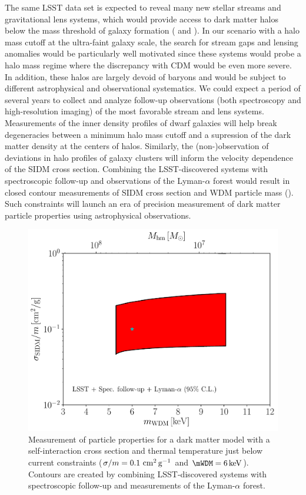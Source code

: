 The same LSST data set is expected to reveal many new stellar streams and gravitational lens systems, which would provide access to dark matter halos below the mass threshold of galaxy formation ( and ).
In our scenario with a halo mass cutoff at the ultra-faint galaxy scale, the search for stream gaps and lensing anomalies would be particularly well motivated since these systems would probe a halo mass regime where the discrepancy with CDM would be even more severe.
In addition, these halos are largely devoid of baryons and would be subject to different astrophysical and observational systematics.
We could expect a period of several years to collect and analyze follow-up observations (both spectroscopy and high-resolution imaging) of the most favorable stream and lens systems.
Measurements of the inner density profiles of dwarf galaxies will help break degeneracies between a minimum halo mass cutoff and a supression of the dark matter density at the centers of halos.
Similarly, the (non-)observation of deviations in halo profiles of galaxy clusters will inform the velocity dependence of the SIDM cross section.
Combining the LSST-discovered systems with spectroscopic follow-up and observations of the Lyman-$\alpha$ forest would result in closed contour measurements of SIDM cross section and WDM particle mass (\citep{sidm_wdm_disc}).
Such constraints will launch an era of precision measurement of dark matter particle properties using astrophysical observations.

\begin{figure}
\centering
\includegraphics[width=0.6\columnwidth]{figures/SIDM_WDM_fig_disc.pdf}
\caption{\label{fig:sidm_wdm_disc} Measurement of particle properties for a dark matter model with a self-interaction cross section and thermal temperature just below current constraints ($\sigma/m = 0.1 \mathrm{\,\mathrm{\,cm}^2\mathrm{\,g}^{-1}}$ and $\mWDM = 6\keV$). Contours are created by combining LSST-discovered systems with spectroscopic follow-up and measurements of the Lyman-$\alpha$ forest.
 
}
\end{figure}

